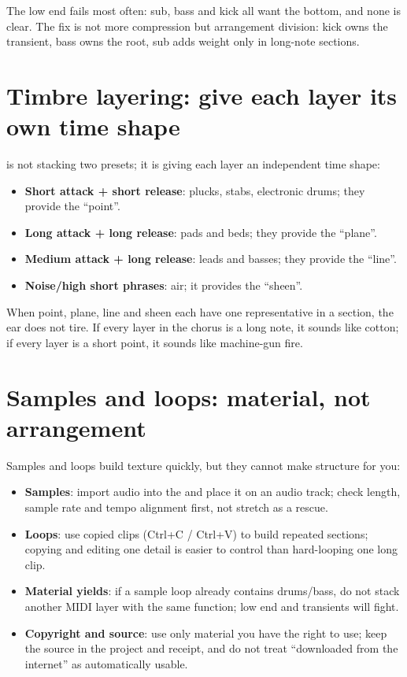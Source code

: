 The low end fails most often: sub, bass and kick all want the bottom, and none is clear. The fix is not more compression but arrangement division: kick owns the transient, bass owns the root, sub adds weight only in long-note sections.

\section{Timbre layering: give each layer its own time shape}
\label{sec:timbre-layering}

 is not stacking two presets; it is giving each layer an independent time shape:

\begin{itemize}
\item \textbf{Short attack + short release}: plucks, stabs, electronic drums; they provide the ``point''.
\item \textbf{Long attack + long release}: pads and beds; they provide the ``plane''.
\item \textbf{Medium attack + long release}: leads and basses; they provide the ``line''.
\item \textbf{Noise/high short phrases}: air; it provides the ``sheen''.
\end{itemize}

When point, plane, line and sheen each have one representative in a section, the ear does not tire. If every layer in the chorus is a long note, it sounds like cotton; if every layer is a short point, it sounds like machine-gun fire.

\section{Samples and loops: material, not arrangement}
\label{sec:sample-loop}

Samples and loops build texture quickly, but they cannot make structure for you:

\begin{itemize}
\item \textbf{Samples}: import audio into the  and place it on an audio track; check length, sample rate and tempo alignment first, not stretch as a rescue.
\item \textbf{Loops}: use copied clips (Ctrl+C / Ctrl+V) to build repeated sections; copying and editing one detail is easier to control than hard-looping one long clip.
\item \textbf{Material yields}: if a sample loop already contains drums/bass, do not stack another MIDI layer with the same function; low end and transients will fight.
\item \textbf{Copyright and source}: use only material you have the right to use; keep the source in the project and receipt, and do not treat ``downloaded from the internet'' as automatically usable.
\end{itemize}

